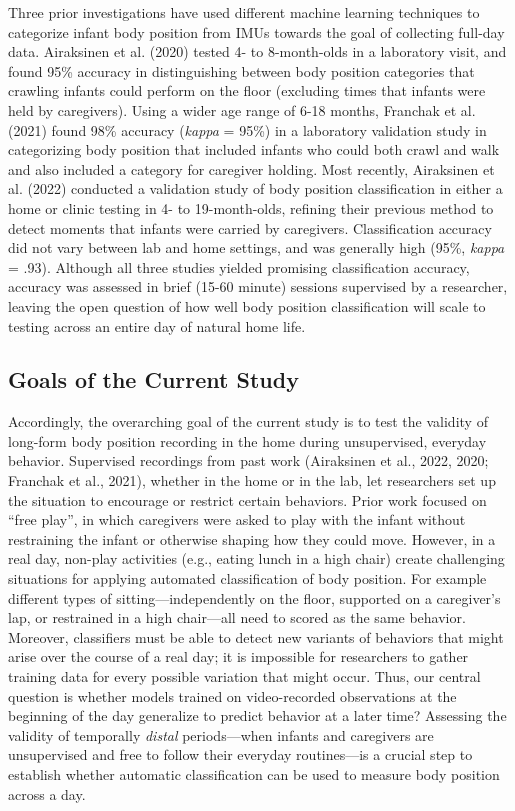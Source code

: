 \documentclass[
  man]{apa6}
\begin{document}
Three prior investigations have used different machine learning techniques to categorize infant body position from IMUs towards the goal of collecting full-day data. Airaksinen et al. (2020) tested 4- to 8-month-olds in a laboratory visit, and found 95\% accuracy in distinguishing between body position categories that crawling infants could perform on the floor (excluding times that infants were held by caregivers). Using a wider age range of 6-18 months, Franchak et al. (2021) found 98\% accuracy (\emph{kappa} = 95\%) in a laboratory validation study in categorizing body position that included infants who could both crawl and walk and also included a category for caregiver holding. Most recently, Airaksinen et al. (2022) conducted a validation study of body position classification in either a home or clinic testing in 4- to 19-month-olds, refining their previous method to detect moments that infants were carried by caregivers. Classification accuracy did not vary between lab and home settings, and was generally high (95\%, \emph{kappa} = .93). Although all three studies yielded promising classification accuracy, accuracy was assessed in brief (15-60 minute) sessions supervised by a researcher, leaving the open question of how well body position classification will scale to testing across an entire day of natural home life.

\hypertarget{goals-of-the-current-study}{%
\subsection{Goals of the Current Study}\label{goals-of-the-current-study}}

Accordingly, the overarching goal of the current study is to test the validity of long-form body position recording in the home during unsupervised, everyday behavior. Supervised recordings from past work (Airaksinen et al., 2022, 2020; Franchak et al., 2021), whether in the home or in the lab, let researchers set up the situation to encourage or restrict certain behaviors. Prior work focused on ``free play'', in which caregivers were asked to play with the infant without restraining the infant or otherwise shaping how they could move. However, in a real day, non-play activities (e.g., eating lunch in a high chair) create challenging situations for applying automated classification of body position. For example different types of sitting---independently on the floor, supported on a caregiver's lap, or restrained in a high chair---all need to scored as the same behavior. Moreover, classifiers must be able to detect new variants of behaviors that might arise over the course of a real day; it is impossible for researchers to gather training data for every possible variation that might occur. Thus, our central question is whether models trained on video-recorded observations at the beginning of the day generalize to predict behavior at a later time? Assessing the validity of temporally \emph{distal} periods---when infants and caregivers are unsupervised and free to follow their everyday routines---is a crucial step to establish whether automatic classification can be used to measure body position across a day.
\end{document}
